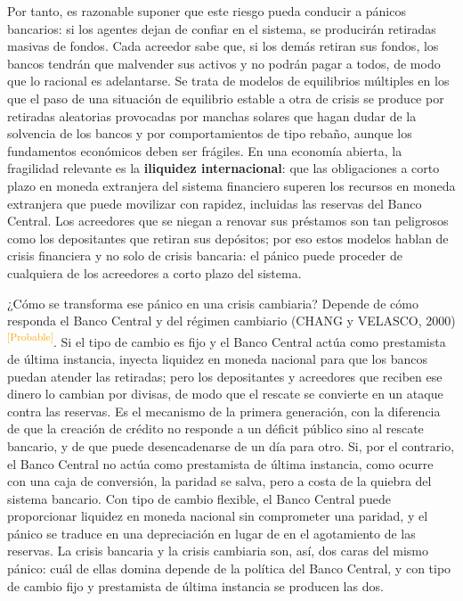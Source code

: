 \documentclass[10pt,a4paper]{article}
\begin{document}
Por tanto, es razonable suponer que este riesgo pueda conducir a pánicos bancarios: si los agentes dejan de confiar en el sistema, se producirán retiradas masivas de fondos. Cada acreedor sabe que, si los demás retiran sus fondos, los bancos tendrán que malvender sus activos y no podrán pagar a todos, de modo que lo racional es adelantarse. Se trata de modelos de equilibrios múltiples en los que el paso de una situación de equilibrio estable a otra de crisis se produce por retiradas aleatorias provocadas por manchas solares que hagan dudar de la solvencia de los bancos y por comportamientos de tipo rebaño, aunque los fundamentos económicos deben ser frágiles. En una economía abierta, la fragilidad relevante es la \textbf{iliquidez internacional}: que las obligaciones a corto plazo en moneda extranjera del sistema financiero superen los recursos en moneda extranjera que puede movilizar con rapidez, incluidas las reservas del Banco Central. Los acreedores que se niegan a renovar sus préstamos son tan peligrosos como los depositantes que retiran sus depósitos; por eso estos modelos hablan de crisis financiera y no solo de crisis bancaria: el pánico puede proceder de cualquiera de los acreedores a corto plazo del sistema.

¿Cómo se transforma ese pánico en una crisis cambiaria? Depende de cómo responda el Banco Central y del régimen cambiario (CHANG y VELASCO, 2000)\textcolor{orange}{\textsuperscript{[Probable]}}. Si el tipo de cambio es fijo y el Banco Central actúa como prestamista de última instancia, inyecta liquidez en moneda nacional para que los bancos puedan atender las retiradas; pero los depositantes y acreedores que reciben ese dinero lo cambian por divisas, de modo que el rescate se convierte en un ataque contra las reservas. Es el mecanismo de la primera generación, con la diferencia de que la creación de crédito no responde a un déficit público sino al rescate bancario, y de que puede desencadenarse de un día para otro. Si, por el contrario, el Banco Central no actúa como prestamista de última instancia, como ocurre con una caja de conversión, la paridad se salva, pero a costa de la quiebra del sistema bancario. Con tipo de cambio flexible, el Banco Central puede proporcionar liquidez en moneda nacional sin comprometer una paridad, y el pánico se traduce en una depreciación en lugar de en el agotamiento de las reservas. La crisis bancaria y la crisis cambiaria son, así, dos caras del mismo pánico: cuál de ellas domina depende de la política del Banco Central, y con tipo de cambio fijo y prestamista de última instancia se producen las dos.
\end{document}
